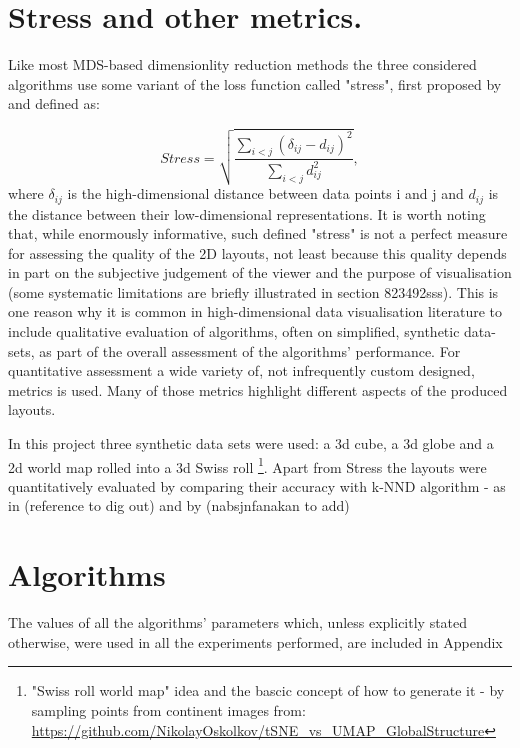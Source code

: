 \documentclass{l4proj}
\begin{document}
\section{Stress and other metrics.}

Like most MDS-based dimensionlity reduction methods the three considered algorithms use some variant of the loss function called "stress", first proposed by \citet{og_stress} and defined as: 

\begin{equation}
\label{tab:stress}
    Stress = \sqrt{\frac{\sum_{i<j}(\delta_{ij} - d_{ij})^2 }{\sum_{i<j}d_{ij}^2}},
\end{equation}    
where $\delta_{ij}$ is the high-dimensional distance between data points i and j and $d_{ij}$ is the distance between their low-dimensional representations. It is worth noting that, while enormously informative, such defined "stress" is not a perfect measure for assessing the quality of the 2D layouts, not least because this quality depends in part on the subjective judgement of the viewer and the purpose of visualisation (some systematic limitations are briefly illustrated in section 823492sss). This is one reason why it is common in  high-dimensional data visualisation literature to include qualitative evaluation of algorithms, often on simplified, synthetic data-sets, as part of the overall assessment of the algorithms' performance. For quantitative assessment a wide variety of, not infrequently custom designed, metrics is used. Many of those metrics highlight different aspects of the produced layouts. 

In this project three synthetic data sets were used: a 3d cube, a 3d globe and a 2d world map rolled into a 3d Swiss roll \footnote{"Swiss roll world map" idea and the bascic concept of how to generate it - by sampling points from continent images from: \url{https://github.com/NikolayOskolkov/tSNE_vs_UMAP_GlobalStructure}}. Apart from Stress the layouts were quantitatively evaluated by comparing their accuracy with k-NND algorithm - as in (reference to dig out) and by (nabsjnfanakan to add)

\section{Algorithms}

The values of all the algorithms' parameters which, unless explicitly stated otherwise, were used in all the experiments performed, are included in Appendix  
    
\end{document}
